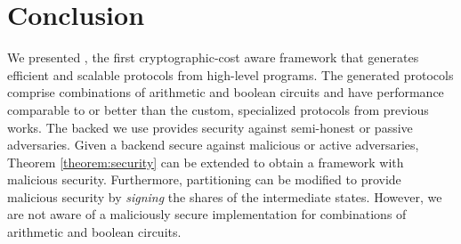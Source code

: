 \section{Conclusion}
\label{sec:conclude}
We presented \tool, the first
cryptographic-cost aware framework that generates efficient and
scalable \mpc protocols from high-level programs.
The generated protocols comprise combinations
of arithmetic and boolean circuits and have performance comparable to
or better than the custom, specialized
protocols from previous works.
The \mpc backed we use provides security against semi-honest or passive adversaries.
Given a \mpc backend secure against malicious or active adversaries, Theorem \ref{theorem:security} 
can be extended to obtain a framework with malicious security. Furthermore,  
partitioning can be modified to provide malicious security by {\it signing} the shares of the intermediate states. However, we are not aware of a maliciously secure \mpc implementation for combinations of
arithmetic and boolean circuits. 


